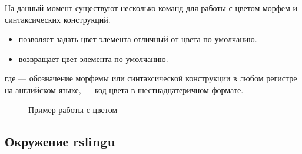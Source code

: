 На данный момент существуют несколько команд для работы с цветом морфем и
синтаксических конструкций.
\begin{itemize}
    \item \manModifier[rsSetColor] позволяет задать цвет элемента отличный от цвета по
    умолчанию.
        \ExplSyntaxOn
        \begin{tcolorbox}
            \manModifier[cmd] \manColon{}
        \end{tcolorbox}
        \ExplSyntaxOff
    \item \manModifier[rsResetColor] возвращает цвет элемента по умолчанию.
        \ExplSyntaxOn
        \begin{tcolorbox}
            \manModifier[cmd] \manColon{}
        \end{tcolorbox}
        \ExplSyntaxOff
\end{itemize}

где  --- обозначение морфемы или синтаксической конструкции в любом
регистре на английском языке,  --- код цвета в шестнадцатеричном формате.

\begin{figure}[H]
    \centering
    \begin{minipage}[c]{0.5\textwidth}
        \begin{Latexcode}
        \end{Latexcode}
    \end{minipage}
    \hfill
    \begin{minipage}[c]{0.4\textwidth}
        \small
    \end{minipage}

    \caption{Пример работы с цветом}
\end{figure}




\subsection{Окружение rslingu}

